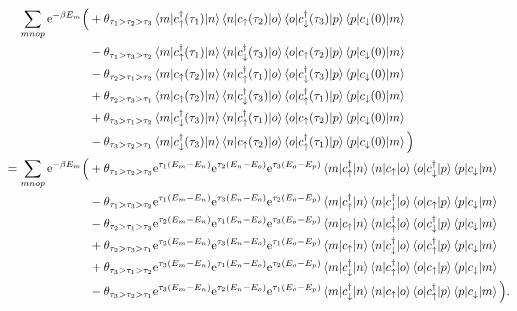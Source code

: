 \documentclass[12pt,a4paper]{scrartcl}
\numberwithin{equation}{section}
\renewcommand{\exp}[1]{\mathrm{e}^{#1}}
\begin{document}
\begin{align}
 \sum_{mnop} \exp{-\beta E_m}\Big(
 &+\theta_{\tau_1 > \tau_2 > \tau_3}\braket{m|c^{\dagger}_{\uparrow}(\tau_1) |n}\braket{n| c_{\uparrow}(\tau_2)|o}\braket{o| c^{\dagger}_{\downarrow}(\tau_3) |p}\braket{p| c_{\downarrow}(0) |m} \nonumber\\
&- \theta_{\tau_1 > \tau_3 > \tau_2}\braket{m|c^{\dagger}_{\uparrow}(\tau_1)|n}\braket{n| c^{\dagger}_{\downarrow}(\tau_3) |o}\braket{o|c_{\uparrow}(\tau_2) |p}\braket{p|c_{\downarrow}(0) |m} \nonumber\\
%
&- \theta_{\tau_2 > \tau_1 > \tau_3}\braket{m|c_{\uparrow}(\tau_2)|n}\braket{n| c^{\dagger}_{\uparrow}(\tau_1) |o}\braket{o|c^{\dagger}_{\downarrow}(\tau_3) |p}\braket{p|c_{\downarrow}(0) |m} \nonumber\\
&+ \theta_{\tau_2 > \tau_3 > \tau_1}\braket{m|c_{\uparrow}(\tau_2) |n}\braket{n|c^{\dagger}_{\downarrow}(\tau_3) |o}\braket{o|c^{\dagger}_{\uparrow}(\tau_1) |p}\braket{p| c_{\downarrow}(0) |m} \nonumber\\
%
&+ \theta_{\tau_3 > \tau_1 > \tau_2 }\braket{m|c^{\dagger}_{\downarrow}(\tau_3) |n}\braket{n|c^{\dagger}_{\uparrow}(\tau_1) |o}\braket{o|c_{\uparrow}(\tau_2) |p}\braket{p|c_{\downarrow}(0) |m} \nonumber\\
&- \theta_{\tau_3 > \tau_2 > \tau_1 }\braket{m|c^{\dagger}_{\downarrow}(\tau_3) |n}\braket{n|c_{\uparrow}(\tau_2) |o}\braket{o|c^{\dagger}_{\uparrow}(\tau_1) |p}\braket{p| c_{\downarrow}(0) |m} \Big) \\
%
%
%
 =\sum_{mnop} \exp{-\beta E_m}\Big(
&+ \theta_{\tau_1 > \tau_2 > \tau_3} \exp{\tau_1(E_m-E_n)}\exp{\tau_2(E_n-E_o)}\exp{\tau_3(E_o-E_p)} \braket{m|c^{\dagger}_{\uparrow}|n}\braket{n| c_{\uparrow}|o}\braket{o| c^{\dagger}_{\downarrow} |p}\braket{p| c_{\downarrow} |m} \nonumber\\
&- \theta_{\tau_1 > \tau_3 > \tau_2} \exp{\tau_1(E_m-E_n)}\exp{\tau_3(E_n-E_o)}\exp{\tau_2(E_o-E_p)} \braket{m|c^{\dagger}_{\uparrow}|n}\braket{n| c^{\dagger}_{\downarrow} |o}\braket{o|c_{\uparrow} |p}\braket{p|c_{\downarrow} |m} \nonumber\\
%
&- \theta_{\tau_2 > \tau_1 > \tau_3} \exp{\tau_2(E_m-E_n)}\exp{\tau_1(E_n-E_o)}\exp{\tau_3(E_o-E_p)} \braket{m|c_{\uparrow}|n}\braket{n| c^{\dagger}_{\uparrow} |o}\braket{o|c^{\dagger}_{\downarrow} |p}\braket{p|c_{\downarrow} |m} \nonumber\\
&+ \theta_{\tau_2 > \tau_3 > \tau_1} \exp{\tau_2(E_m-E_n)}\exp{\tau_3(E_n-E_o)}\exp{\tau_1(E_o-E_p)} \braket{m|c_{\uparrow} |n}\braket{n|c^{\dagger}_{\downarrow} |o}\braket{o|c^{\dagger}_{\uparrow} |p}\braket{p| c_{\downarrow} |m} \nonumber\\
%
&+ \theta_{\tau_3 > \tau_1 > \tau_2} \exp{\tau_3(E_m-E_n)}\exp{\tau_1(E_n-E_o)}\exp{\tau_2(E_o-E_p)} \braket{m|c^{\dagger}_{\downarrow} |n}\braket{n|c^{\dagger}_{\uparrow} |o}\braket{o|c_{\uparrow} |p}\braket{p|c_{\downarrow} |m} \nonumber\\
&- \theta_{\tau_3 > \tau_2 > \tau_1} \exp{\tau_3(E_m-E_n)}\exp{\tau_2(E_n-E_o)}\exp{\tau_1(E_o-E_p)} \braket{m|c^{\dagger}_{\downarrow} |n}\braket{n|c_{\uparrow} |o}\braket{o|c^{\dagger}_{\uparrow} |p}\braket{p| c_{\downarrow} |m} \Big).
\end{align}
\end{document}
